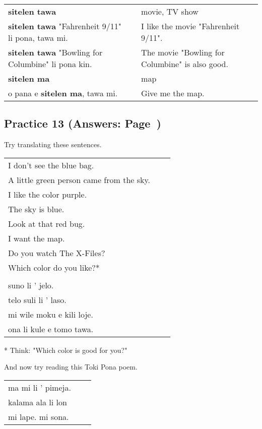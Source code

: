 \begin{supertabular}{p{5,5cm}|ll}
\textbf{sitelen tawa}  && movie, TV show \\
\textbf{sitelen tawa} "Fahrenheit 9/11" li pona, tawa mi. && I like the movie "Fahrenheit 9/11". \\
\textbf{sitelen tawa} "Bowling for Columbine" li pona kin. && The movie "Bowling for Columbine" is also good. \\
\textbf{sitelen ma} && map \\
o pana e \textbf{sitelen ma}, tawa mi. && Give me the map. \\
\end{supertabular} 
%
\subsection*{Practice 13 (Answers: Page~\pageref{'colors'})}
%
Try translating these sentences. \\

\begin{supertabular}{p{5,5cm}|ll}
I don't see the blue bag. &&   \\ %
A little green person came from the sky. &&   \\ %
I like the color purple.  &&  \\ %
The sky is blue. &&   \\ %
Look at that red bug.  &&  \\ %
I want the map.  &&  \\ %
Do you watch The X-Files? &&  \\  %
Which color do you like?* &&  \\  %
 && \\ %
suno li ' jelo. &&   \\ %
telo suli li ' laso.  &&  \\ %
mi wile moku e kili loje.  &&  \\ %
ona li kule e tomo tawa. &&   \\ %
\end{supertabular} 

* Think: "Which color is good for you?" 

And now try reading this Toki Pona poem. 

\begin{supertabular}{p{5,5cm}|ll}
ma mi li ' pimeja. && \\ %
kalama ala li lon && \\ %
mi lape. mi sona. && \\ %
\end{supertabular} 
